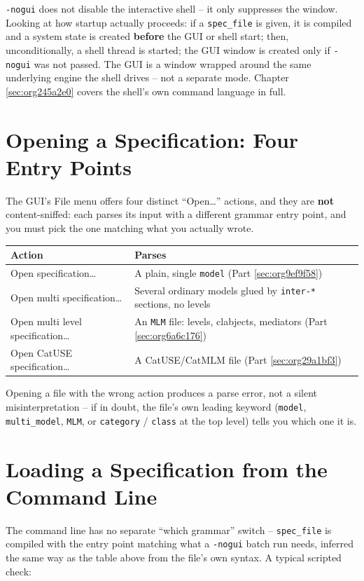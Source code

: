 \documentclass[11pt,twoside,a4paper]{book}
\begin{document}
\texttt{-nogui} does not disable the interactive shell -- it only suppresses
the window. Looking at how startup actually proceeds: if a
\texttt{spec\_file} is given, it is compiled and a system state is created
\textbf{before} the GUI or shell start; then, unconditionally, a shell thread
is started; the GUI window is created only if \texttt{-nogui} was not passed.
The GUI is a window wrapped around the same underlying engine the
shell drives -- not a separate mode. Chapter
\ref{sec:org245a2e0} covers the shell's own command
language in full.

\section{Opening a Specification: Four Entry Points}
\label{sec:orgaa6bef6}

The GUI's File menu offers four distinct ``Open\ldots{}'' actions, and they
are \textbf{not} content-sniffed: each parses its input with a different
grammar entry point, and you must pick the one matching what you
actually wrote.

\begin{center}
\begin{tabular}{lp{9cm}}
Action & Parses\\[0pt]
\hline
Open specification\ldots{} & A plain, single \texttt{model} (Part \ref{sec:org9ef9f58})\\[0pt]
Open multi specification\ldots{} & Several ordinary models glued by \texttt{inter-*} sections, no levels\\[0pt]
Open multi level specification\ldots{} & An \texttt{MLM} file: levels, clabjects, mediators (Part \ref{sec:org6a6c176})\\[0pt]
Open CatUSE specification\ldots{} & A CatUSE/CatMLM file (Part \ref{sec:org29a1bf3})\\[0pt]
\end{tabular}
\end{center}

Opening a file with the wrong action produces a parse error, not a
silent misinterpretation -- if in doubt, the file's own leading
keyword (\texttt{model}, \texttt{multi\_model}, \texttt{MLM}, or \texttt{category} / \texttt{class} at
the top level) tells you which one it is.

\section{Loading a Specification from the Command Line}
\label{sec:org1483098}
The command line has no separate ``which grammar'' switch -- \texttt{spec\_file}
is compiled with the entry point matching what a \texttt{-nogui} batch run
needs, inferred the same way as the table above from the file's own
syntax. A typical scripted check:
\end{document}

